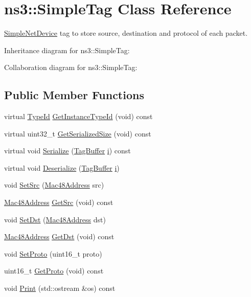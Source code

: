 \hypertarget{classns3_1_1SimpleTag}{}\section{ns3\+:\+:Simple\+Tag Class Reference}
\label{classns3_1_1SimpleTag}


\hyperlink{classns3_1_1SimpleNetDevice}{Simple\+Net\+Device} tag to store source, destination and protocol of each packet.  




Inheritance diagram for ns3\+:\+:Simple\+Tag\+:


Collaboration diagram for ns3\+:\+:Simple\+Tag\+:
\subsection*{Public Member Functions}
\begin{DoxyCompactItemize}
\item 
virtual \hyperlink{classns3_1_1TypeId}{Type\+Id} \hyperlink{classns3_1_1SimpleTag_a439d3869f9e359e13c32601b6b8ee09b}{Get\+Instance\+Type\+Id} (void) const 
\item 
virtual uint32\+\_\+t \hyperlink{classns3_1_1SimpleTag_a8bd37f2d4bf07f64372becce2db78e1d}{Get\+Serialized\+Size} (void) const 
\item 
virtual void \hyperlink{classns3_1_1SimpleTag_a0c5bdb3cd057cafb8e9f5fa7dda187e9}{Serialize} (\hyperlink{classns3_1_1TagBuffer}{Tag\+Buffer} \hyperlink{lte__uplink__power__control_8m_a6f6ccfcf58b31cb6412107d9d5281426}{i}) const 
\item 
virtual void \hyperlink{classns3_1_1SimpleTag_a794f63c51ab97cef29f81b01be377bc7}{Deserialize} (\hyperlink{classns3_1_1TagBuffer}{Tag\+Buffer} \hyperlink{lte__uplink__power__control_8m_a6f6ccfcf58b31cb6412107d9d5281426}{i})
\item 
void \hyperlink{classns3_1_1SimpleTag_a5b3676fc083f40ce0eae43fa482ac937}{Set\+Src} (\hyperlink{classns3_1_1Mac48Address}{Mac48\+Address} src)
\item 
\hyperlink{classns3_1_1Mac48Address}{Mac48\+Address} \hyperlink{classns3_1_1SimpleTag_aeb0f7070a7233f73e0d319d17a0c6c3a}{Get\+Src} (void) const 
\item 
void \hyperlink{classns3_1_1SimpleTag_adcf2cbcd8d378b59d5e04e19ed6b929b}{Set\+Dst} (\hyperlink{classns3_1_1Mac48Address}{Mac48\+Address} dst)
\item 
\hyperlink{classns3_1_1Mac48Address}{Mac48\+Address} \hyperlink{classns3_1_1SimpleTag_a93daa07471533432321e3a63a14ed632}{Get\+Dst} (void) const 
\item 
void \hyperlink{classns3_1_1SimpleTag_a8af89630012d81165becd7ae880e7209}{Set\+Proto} (uint16\+\_\+t proto)
\item 
uint16\+\_\+t \hyperlink{classns3_1_1SimpleTag_a8633b2158afac8be7c9fb51528ce2af9}{Get\+Proto} (void) const 
\item 
void \hyperlink{classns3_1_1SimpleTag_aeedea5c2eb94073cea7d8918a260e8a2}{Print} (std\+::ostream \&os) const 
\end{DoxyCompactItemize}
